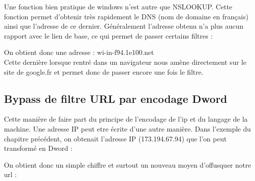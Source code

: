 \documentclass{article}
\begin{document}
Une fonction bien pratique de windows n'est autre que NSLOOKUP. Cette fonction permet d'obtenir très rapidement le DNS (nom de domaine en français) ainsi que l'adresse de ce dernier. Généralement l'adresse obtenu n'a plus aucun rapport avec le lien de base, ce qui permet de passer certains filtres :
\vspace{0.2cm}\\
\vspace{0.2cm}

On obtient donc une adresse : wi-in-f94.1e100.net\\
Cette dernière lorsque rentré dans un navigateur nous amène directement sur le site de google.fr et permet donc de passer encore une fois le filtre.

\subsection{Bypass de filtre URL par encodage Dword}

Cette manière de faire part du principe de l'encodage de l'ip et du langage de la machine. Une adresse IP peut etre écrite d'une autre manière. Dans l'exemple du chapitre précédent, on obtenait l'adresse IP (173.194.67.94) que l'on peut transformé en Dword :
\vspace{0.2cm}\\
\vspace{0.2cm}

On obtient donc un simple chiffre et surtout un nouveau moyen d'offusquer notre url :
\vspace{0.2cm}\\
\vspace{0.2cm}
\end{document}
